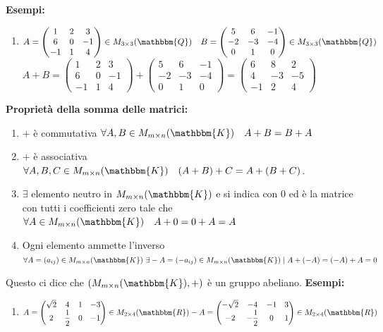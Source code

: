 \documentclass[12pt, letterpaper]{report}
\begin{document}
 		\textbf{Esempi:}
 		\begin{enumerate}
 			\item $A = \begin{pmatrix}
 				1 & 2 & 3 \\
 				6 & 0 & -1 \\
 				-1 & 1 & 4
 			\end{pmatrix} \in M_{3 \times 3}(\mathbbm{Q}) \quad B = \begin{pmatrix}
 			5 & 6 & -1 \\
 			-2 & -3 & -4 \\
 			0 & 1 & 0
 			\end{pmatrix} \in M_{3 \times 3}(\mathbbm{Q})$ \\
 			$A + B = \begin{pmatrix}
 				1 & 2 & 3 \\
 				6 & 0 & -1 \\
 				-1 & 1 & 4
 			\end{pmatrix} + \begin{pmatrix}
 			5 & 6 & -1 \\
 			-2 & -3 & -4 \\
 			0 & 1 & 0
 			\end{pmatrix} = \begin{pmatrix}
 			6 & 8 & 2 \\
 			4 & -3 & -5 \\
 			-1 & 2 & 4
 			\end{pmatrix}$
  		\end{enumerate}
  		\textbf{Proprietà della somma delle matrici:}
  		\begin{enumerate}
  			\item $+$ è commutativa $\forall A, B \in M_{m \times n}(\mathbbm{K}) \quad A + B = B + A$
  			\item $+$ è associativa $\forall A, B, C \in M_{m \times n}(\mathbbm{K}) \quad (A + B) + C = A + (B + C)$.
  			\item $\exists$ elemento neutro in $M_{m \times n}(\mathbbm{K})$ e si indica con 0 ed è la matrice con tutti i coefficienti zero tale che $\forall A \in M_{m \times n}(\mathbbm{K}) \quad A + 0 = 0 + A = A$
  			\item Ogni elemento ammette l'inverso $\forall A = (a_{ij}) \in M_{m \times n}(\mathbbm{K})\ \exists -A = (-a_{ij}) \in M_{m \times n}(\mathbbm{K}) \mid A + (-A) = (-A) + A = 0$
  		\end{enumerate}
  		Questo ci dice che $(M_{m \times n}(\mathbbm{K}), +)$ è un gruppo abeliano.
  		\textbf{Esempi:}
  		\begin{enumerate}
  			\item $A = \begin{pmatrix}
  				\sqrt{2} & 4 & 1 & -3 \\
  				2 & \dfrac{1}{2} & 0 & -1
  			\end{pmatrix} \in M_{2 \times 4}(\mathbbm{R})\\
  			-A = \begin{pmatrix}
 				-\sqrt{2} & -4 & -1 & 3 \\
 				-2 & -\dfrac{1}{2} & 0 & 1
  			\end{pmatrix} \in M_{2 \times 4}(\mathbbm{R})$
  		\end{enumerate}
\end{document}

